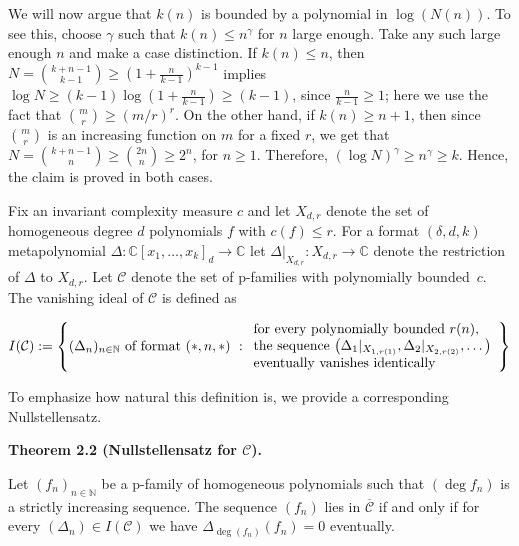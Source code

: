 \documentclass[10pt,a4paper]{article}
\begin{document}
We will now argue that $k(n)$ is bounded by a polynomial in $\log(N(n))$.
To see this, choose $\gamma$ such that $k(n)\leq n^{\gamma}$ for $n$ large enough.
Take any such large enough $n$ and make a case distinction.
If $k(n)\leq n$, then $N=\binom{k+n-1}{k-1}\geq(1+\frac{n}{k-1})^{k-1}$ implies $\log N\geq(k-1)\log(1+\frac{n}{k-1})\geq(k-1)$, since $\frac{n}{k-1}\geq 1$; here we use the fact that $\binom{m}{r}\geq(m/r)^{r}$.
On the other hand, if $k(n)\geq n+1$, then since $\binom{m}{r}$ is an increasing function on $m$ for a fixed $r$, we get that $N=\binom{k+n-1}{n}\geq\binom{2n}{n}\geq 2^{n}$, for $n\geq 1$.
Therefore, $(\log N)^{\gamma}\geq n^{\gamma}\geq k$.
Hence, the claim is proved in both cases.





Fix an invariant complexity measure $c$ and let $X_{d,r}$ denote the set of homogeneous degree $d$ polynomials $f$ with $c(f)\leq r$.
For a format $(\delta,d,k)$ metapolynomial $\Delta:\mathbb{C}[x_{1},\ldots,x_{k}]_{d}\to\mathbb{C}$ let $\Delta|_{X_{d,r}}:X_{d,r}\to\mathbb{C}$ denote the restriction of $\Delta$ to $X_{d,r}$.
Let $\mathcal{C}$ denote the set of p-families with polynomially bounded $c$.
The vanishing ideal of $\mathcal{C}$ is defined as





\[\begin{aligned}
\displaystyle I(\mathcal{C}):=\left\{(\Delta_{n})_{n\in\mathbb{N}}\textup{ of format $(\ast,n,\ast)$ }:\begin{array}[]{l}\text{for every polynomially bounded }r(n),\\ \text{the sequence }\big{(}\Delta_{1}|_{X_{1,r(1)}},\Delta_{2}|_{X_{2,r(2)}},\ldots\big{)}\\ \text{eventually vanishes identically}\end{array}\right\}
\end{aligned}\]




To emphasize how natural this definition is, we provide a corresponding Nullstellensatz.





\par\medskip\noindent\textbf{Theorem 2.2 (Nullstellensatz for $\mathcal{C}$).}\par



Let $(f_{n})_{n\in\mathbb{N}}$ be a p-family of homogeneous polynomials such that $(\deg f_{n})$ is a strictly increasing sequence. The sequence $(f_{n})$ lies in $\overline{\mathcal{C}}$ if and only if for every $(\Delta_{n})\in I(\mathcal{C})$ we have $\Delta_{\deg(f_{n})}(f_{n})=0$ eventually.
\end{document}
